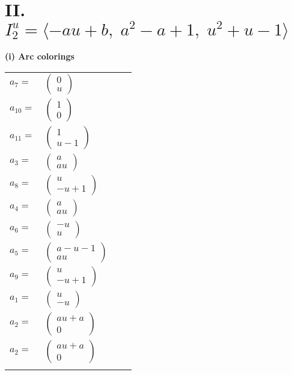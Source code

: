 \documentclass[1p]{elsarticle_modified}
\theoremstyle{definition}
\begin{document}
\centering \section*{II. $I^u_{2}= \langle - a u+b,\;a^2- a+1,\;u^2+u-1 \rangle$}
\flushleft \textbf{(i) Arc colorings}\\
\begin{tabular}{m{7pt} m{180pt} m{7pt} m{180pt} }
\flushright $a_{7}=$&$\begin{pmatrix}0\\u\end{pmatrix}$ \\
\flushright $a_{10}=$&$\begin{pmatrix}1\\0\end{pmatrix}$ \\
\flushright $a_{11}=$&$\begin{pmatrix}1\\u-1\end{pmatrix}$ \\
\flushright $a_{3}=$&$\begin{pmatrix}a\\a u\end{pmatrix}$ \\
\flushright $a_{8}=$&$\begin{pmatrix}u\\- u+1\end{pmatrix}$ \\
\flushright $a_{4}=$&$\begin{pmatrix}a\\a u\end{pmatrix}$ \\
\flushright $a_{6}=$&$\begin{pmatrix}- u\\u\end{pmatrix}$ \\
\flushright $a_{5}=$&$\begin{pmatrix}a- u-1\\a u\end{pmatrix}$ \\
\flushright $a_{9}=$&$\begin{pmatrix}u\\- u+1\end{pmatrix}$ \\
\flushright $a_{1}=$&$\begin{pmatrix}u\\- u\end{pmatrix}$ \\
\flushright $a_{2}=$&$\begin{pmatrix}a u+a\\0\end{pmatrix}$\\ \flushright $a_{2}=$&$\begin{pmatrix}a u+a\\0\end{pmatrix}$\\&\end{tabular}
\end{document}
